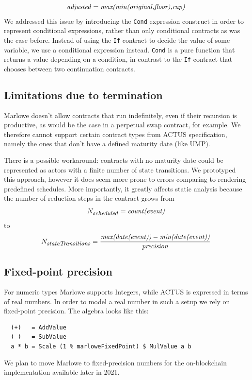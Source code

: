 \documentclass[runningheads]{llncs}
\newcommand{\ident}[1]{\mbox{\emph{#1}}}
\begin{document}
\noindent 
\begin{equation}
\ident{adjusted}=\ident{max(min(original,floor),cap)}
\end{equation}
\noindent
We addressed this issue by introducing the \texttt{Cond} expression construct in order
to represent conditional expressions, rather than only conditional contracts as was the case before. Instead of using the \texttt{If}
contract to decide the value of some variable, we use a conditional expression instead.  
\texttt{Cond} is  a pure function
that returns a value depending on a condition, in contrast to the \texttt{If}
contract that chooses between two continuation contracts. 

\subsection{Limitations due to termination}

Marlowe doesn't allow contracts that run indefinitely, even if their recursion
is productive, as would be the case in a perpetual swap contract, for example. We therefore cannot support certain
contract types from ACTUS specification, namely the ones that don't
have a defined maturity date (like UMP). 

There is a possible workaround: contracts with no maturity date
could be represented as actors with a finite number of state transitions.
We prototyped this approach, %
however it does
seem more prone to errors comparing to rendering predefined schedules.
More importantly, it greatly affects static analysis because the number
of reduction steps in the contract grows from 
\noindent 
\begin{equation*}
N_{\footnotesize \ident{scheduled}}=\ident{count(event)}
\end{equation*}
to 
\noindent 
\begin{equation}
N_{\footnotesize \ident{stateTransitions}}=\frac{\ident{max(date(event))}-\ident{min(date(event))}}{\ident{precision}} 
\end{equation}

\subsection{Fixed-point precision }

For numeric types Marlowe supports Integers, while ACTUS is expressed in terms
of real numbers. In order to model a real number in such a setup
we rely on fixed-point precision. The algebra looks like this: 
\begin{verbatim}
  (+)   = AddValue
  (-)   = SubValue
  a * b = Scale (1 % marloweFixedPoint) $ MulValue a b
\end{verbatim}
\noindent
We plan to move Marlowe to fixed-precision numbers for the on-blockchain implementation available later in 2021.
\end{document}
